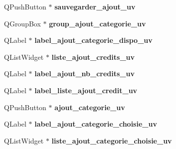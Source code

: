 \begin{DoxyCompactItemize}
\item 
\hypertarget{class_ui___administration_a8dd052324c85577cea76b3879f2b5f8f}{Q\+Push\+Button $\ast$ {\bfseries sauvegarder\+\_\+ajout\+\_\+uv}}\label{class_ui___administration_a8dd052324c85577cea76b3879f2b5f8f}

\item 
\hypertarget{class_ui___administration_a6999fa24ef66b74cc23008ac8919e767}{Q\+Group\+Box $\ast$ {\bfseries group\+\_\+ajout\+\_\+categorie\+\_\+uv}}\label{class_ui___administration_a6999fa24ef66b74cc23008ac8919e767}

\item 
\hypertarget{class_ui___administration_ae00200d0aa5983198c0d37c340b261f0}{Q\+Label $\ast$ {\bfseries label\+\_\+ajout\+\_\+categorie\+\_\+dispo\+\_\+uv}}\label{class_ui___administration_ae00200d0aa5983198c0d37c340b261f0}

\item 
\hypertarget{class_ui___administration_a465d8515bba8b4cf3a7cd0be9940c902}{Q\+List\+Widget $\ast$ {\bfseries liste\+\_\+ajout\+\_\+credits\+\_\+uv}}\label{class_ui___administration_a465d8515bba8b4cf3a7cd0be9940c902}

\item 
\hypertarget{class_ui___administration_a4c4fb9a7f637eeb52586bf25015ca5ac}{Q\+Label $\ast$ {\bfseries label\+\_\+ajout\+\_\+nb\+\_\+credits\+\_\+uv}}\label{class_ui___administration_a4c4fb9a7f637eeb52586bf25015ca5ac}

\item 
\hypertarget{class_ui___administration_a10c38560d243e3a814c6238ed68995ae}{Q\+Label $\ast$ {\bfseries label\+\_\+liste\+\_\+ajout\+\_\+credit\+\_\+uv}}\label{class_ui___administration_a10c38560d243e3a814c6238ed68995ae}

\item 
\hypertarget{class_ui___administration_a1bd575272efae72f58f3e8fa47bd67ee}{Q\+Push\+Button $\ast$ {\bfseries ajout\+\_\+categorie\+\_\+uv}}\label{class_ui___administration_a1bd575272efae72f58f3e8fa47bd67ee}

\item 
\hypertarget{class_ui___administration_aea8b5a9ebef832c562fe412a71f2b2f1}{Q\+Label $\ast$ {\bfseries label\+\_\+ajout\+\_\+categorie\+\_\+choisie\+\_\+uv}}\label{class_ui___administration_aea8b5a9ebef832c562fe412a71f2b2f1}

\item 
\hypertarget{class_ui___administration_ad6fd952aca8c348f02703d23c5b44544}{Q\+List\+Widget $\ast$ {\bfseries liste\+\_\+ajout\+\_\+categorie\+\_\+choisie\+\_\+uv}}\label{class_ui___administration_ad6fd952aca8c348f02703d23c5b44544}


\end{DoxyCompactItemize}
